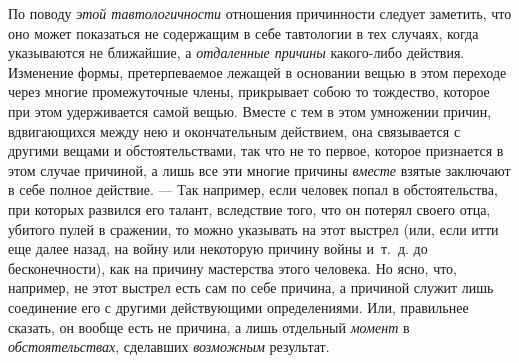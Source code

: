 По поводу {\em этой тавтологичности} отношения
причинности следует заметить, что оно может показаться не содержащим в себе
тавтологии в тех случаях, когда указываются не ближайшие, а
{\em отдаленные причины} какого-либо действия.
Изменение формы, претерпеваемое лежащей в основании вещью в этом переходе
через многие промежуточные члены, прикрывает собою то тождество, которое
при этом удерживается самой вещью. Вместе с тем в этом умножении причин,
вдвигающихся между нею и окончательным действием, она связывается с другими
вещами и обстоятельствами, так что не то первое, которое признается в этом
случае причиной, а лишь все эти многие причины
{\em вместе} взятые заключают в себе полное действие. —
Так например, если человек попал в обстоятельства, при которых развился его
талант, вследствие того, что он потерял своего отца, убитого пулей в
сражении, то можно указывать на этот выстрел (или, если итти еще далее
назад, на войну или некоторую причину войны и~т.~д. до бесконечности), как
на причину мастерства этого человека. Но ясно, что, например, не этот
выстрел есть сам по себе причина, а причиной служит лишь соединение его с
другими действующими определениями. Или, правильнее сказать, он вообще есть
не причина, а лишь отдельный {\em момент} в
{\em обстоятельствах}, сделавших
{\em возможным} результат.

